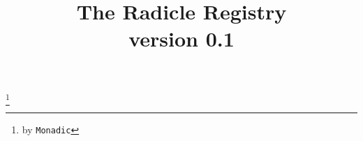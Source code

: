 \documentclass[a4paper, oneside, 11pt, final]{amsart}
\begin{document}
\title[Radicle Registry]{The Radicle Registry \\ {\tiny version 0.1}}
\thanks{by \texttt{Monadic}}

\maketitle

\bigskip
\tableofcontents
\newpage



\end{document}
